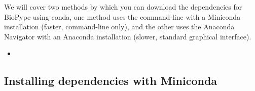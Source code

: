We will cover two methods by which you can download the dependencies for BioPype using conda, one method uses the command-line with a Miniconda installation (faster, command-line only), and the other uses the Anaconda Navigator with an Anaconda installation (slower, standard graphical interface). 
\begin{itemize}
\item {} 
\end{itemize}

\subsection{Installing dependencies with Miniconda}
